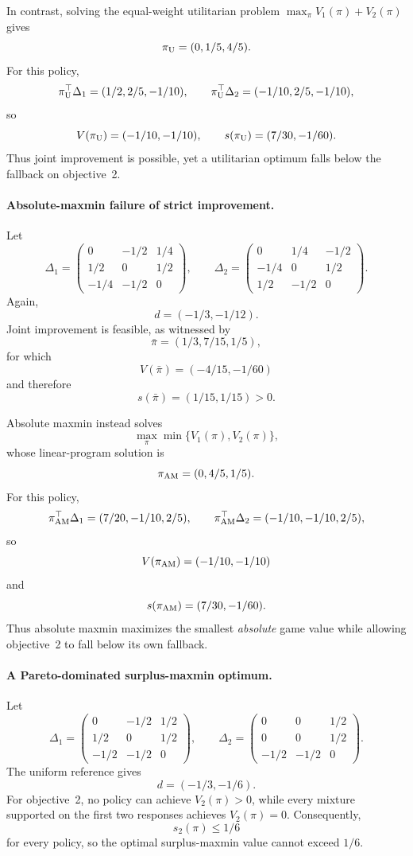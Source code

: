 \documentclass{article}
\theoremstyle{remark}
\theoremstyle{plain}
\begin{document}
In contrast, solving the equal-weight utilitarian problem
$\max_\pi V_1(\pi)+V_2(\pi)$ gives
\[
\pi_{\rm U}=(0,1/5,4/5).
\]
For this policy,
\[
\pi_{\rm U}^\top \Delta_1=(1/2,2/5,-1/10),
\qquad
\pi_{\rm U}^\top \Delta_2=(-1/10,2/5,-1/10),
\]
so
\[
V(\pi_{\rm U})=(-1/10,-1/10),
\qquad
s(\pi_{\rm U})
=
(7/30,-1/60).
\]
Thus joint improvement is possible, yet a utilitarian optimum falls
below the fallback on objective~2.

\paragraph{Absolute-maxmin failure of strict improvement.}
Let
\[
\Delta_1=
\begin{pmatrix}
0&-1/2&1/4\\
1/2&0&1/2\\
-1/4&-1/2&0
\end{pmatrix},
\qquad
\Delta_2=
\begin{pmatrix}
0&1/4&-1/2\\
-1/4&0&1/2\\
1/2&-1/2&0
\end{pmatrix}.
\]
Again,
\[
d=(-1/3,-1/12).
\]
Joint improvement is feasible, as witnessed by
\[
\bar\pi=(1/3,7/15,1/5),
\]
for which
\[
V(\bar\pi)=(-4/15,-1/60)
\]
and therefore
\[
s(\bar\pi)=(1/15,1/15)>0.
\]

Absolute maxmin instead solves
\[
\max_{\pi}\min\{V_1(\pi),V_2(\pi)\},
\]
whose linear-program solution is
\[
\pi_{\rm AM}=(0,4/5,1/5).
\]
For this policy,
\[
\pi_{\rm AM}^\top \Delta_1=(7/20,-1/10,2/5),
\qquad
\pi_{\rm AM}^\top \Delta_2=(-1/10,-1/10,2/5),
\]
so
\[
V(\pi_{\rm AM})=(-1/10,-1/10)
\]
and
\[
s(\pi_{\rm AM})
=
(7/30,-1/60).
\]
Thus absolute maxmin maximizes the smallest \emph{absolute} game value
while allowing objective~2 to fall below its own fallback.

\paragraph{A Pareto-dominated surplus-maxmin optimum.}
Let
\[
\Delta_1=
\begin{pmatrix}
0&-1/2&1/2\\
1/2&0&1/2\\
-1/2&-1/2&0
\end{pmatrix},
\qquad
\Delta_2=
\begin{pmatrix}
0&0&1/2\\
0&0&1/2\\
-1/2&-1/2&0
\end{pmatrix}.
\]
The uniform reference gives
\[
d=(-1/3,-1/6).
\]
For objective~2, no policy can achieve $V_2(\pi)>0$, while every mixture
supported on the first two responses achieves $V_2(\pi)=0$.
Consequently,
\[
s_2(\pi)\le 1/6
\]
for every policy, so the optimal surplus-maxmin value cannot exceed
$1/6$.
\end{document}
